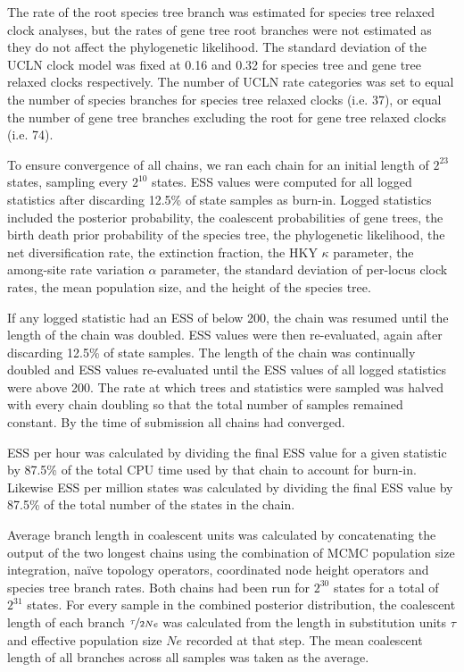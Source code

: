 \documentclass[nogrid]{MBE}%
\begin{document}
The rate of the root species tree branch was estimated for species tree relaxed
clock analyses, but the rates of gene tree root branches were not estimated as
they do not affect the phylogenetic likelihood. The standard deviation of the
UCLN clock model was fixed at 0.16 and 0.32 for species tree and gene tree
relaxed clocks respectively. The number of UCLN rate categories was set to equal
the number of species branches for species tree relaxed clocks (i.e. 37), or
equal the number of gene tree branches excluding the root for gene tree
relaxed clocks (i.e. 74).

To ensure convergence of all chains, we ran each chain for an initial length of
$2^{23}$ states, sampling every $2^{10}$ states. ESS values were computed for
all logged statistics after discarding 12.5\% of state samples as burn-in. Logged
statistics included the posterior probability, the
coalescent probabilities of gene trees, the birth death prior
probability of the species tree, the phylogenetic likelihood, the net
diversification rate, the extinction fraction, the HKY $\kappa$ parameter, the
among-site rate variation $\alpha$ parameter, the standard deviation of
per-locus clock rates, the mean population size, and the height of the species tree.

If any logged statistic had an ESS of below 200, the chain was resumed until the
length of the chain was doubled. ESS values were then re-evaluated, again after
discarding 12.5\% of state samples. The length of the chain was continually
doubled and ESS values re-evaluated until the ESS values of all logged
statistics were above 200. The rate at which trees and statistics were sampled
was halved with every chain doubling so that the total number of samples
remained constant. By the time of submission all chains had converged.

ESS per hour was calculated by dividing the final ESS value for a given
statistic by 87.5\% of the total CPU time used by that chain to account for
burn-in. Likewise ESS per million states was calculated by dividing the final ESS
value by 87.5\% of the total number of the states in the chain. 

Average branch length in coalescent units was calculated by concatenating the
output of the two longest chains using the combination of MCMC population
size integration, na\"ive topology operators, coordinated node height operators
and species tree branch rates. Both chains had been run for $2^{30}$ states for
a total of $2^{31}$ states. For every sample in the combined posterior
distribution, the coalescent length of each branch $\nicefrac{\tau}{2Ne}$ was calculated from the
length in substitution units $\tau$ and effective population size $Ne$ recorded at that
step. The mean coalescent length of all branches across all samples was taken as
the average.
\end{document}
